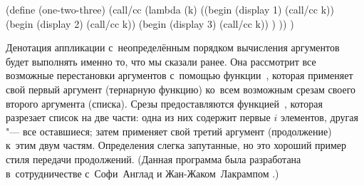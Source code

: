 \begin{code:lisp}
(define (one-two-three)
  (call/cc (lambda (k)
             ((begin (display 1) (call/cc k))
              (begin (display 2) (call/cc k))
              (begin (display 3) (call/cc k)) ) )) )
\end{code:lisp}

Денотация аппликации с~неопределённым порядком вычисления аргументов будет
выполнять именно то, что мы сказали ранее. Она рассмотрит все возможные
перестановки аргументов с~помощью функции~, которая применяет свой
первый аргумент (тернарную функцию) ко~всем возможным срезам своего второго
аргумента (списка). Срезы предоставляются функцией~, которая разрезает
список на две части: одна из них содержит первые $i$ элементов, другая "--- все
оставшиеся; затем  применяет свой третий аргумент (продолжение) к~этим
двум частям. Определения слегка запутанные, но это хороший пример стиля передачи
продолжений. (Данная программа была разработана в~сотрудничестве с~Софи~Англад и
Жан-Жаком~Лакрампом \cite{alq95}.)

